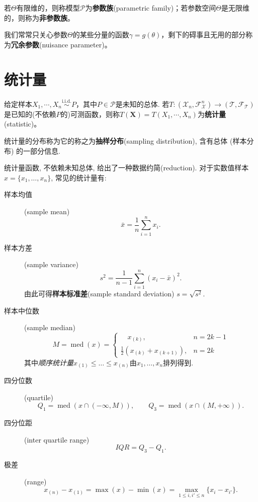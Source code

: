 \begin{definition}
      若$\Theta$有限维的，则称模型$\mathcal{P}$为\textbf{参数族}(parametric family)；若参数空间$\Theta$是无限维的，则称为\textbf{非参数族}。
\end{definition}

我们常常只关心参数$\Theta$的某些分量的函数$\gamma=g(\theta)$，剩下的碍事且无用的部分称为\textbf{冗余参数}(nuisance parameter)。

\section{统计量}

\begin{definition}[统计量]
      给定样本$X_1,\cdots ,X_n \overset{\text{i.i.d.}}{\sim} P$，其中$P \in \mathcal{P}$是未知的总体. 若$ T:(\mathcal{X}_n,\mathscr{F}^n_\mathcal{X})\to (\mathcal{T} ,\mathscr{F}_\mathcal{T})$是已知的(不依赖$P$的)可测函数，则称$T(\mathbf{X})=T(X_1,\cdots ,X_n)$为\textbf{统计量}(statistic)。
\end{definition}

\begin{definition}
      统计量的分布称为它的称之为\textbf{抽样分布}(sampling distribution), 含有总体 (样本分布) 的一部分信息.
\end{definition}

统计量函数, 不依赖未知总体, 给出了一种数据约简(reduction). 对于实数值样本$x = \{x_{1},\dots,x_{n}\}$, 常见的统计量有: \label{descriptive-statistics}
\begin{description}
      \item [样本均值](sample mean)
            \[ \bar{x} = \frac{1}{n}\sum_{i=1}^{n}x_{i}. \]
      \item [样本方差](sample variance)
            \[ s^{2} = \frac{1}{n-1}\sum_{i=1}^{n}(x_{i}-\bar{x})^{2}. \]
            由此可得\textbf{样本标准差}(sample standard deviation) $s = \sqrt{s^2}$.
      \item [样本中位数](sample median)
            \[ M = \operatorname{med}(x) = \begin{cases}
                        \quad x_{(k)},                  & n = 2k-1 \\
                        \frac{1}{2}(x_{(k)}+x_{(k+1)}), & n = 2k
                  \end{cases} \]
            其中\emph{顺序统计量}$x_{(1)}\leq\dots\leq x_{(n)}$由$x_{1},\dots,x_{n}$排列得到.
      \item [四分位数](quartile)
            \[ Q_{1} = \operatorname{med}(x\cap(-\infty,M)), \qquad
                  Q_{3} = \operatorname{med}(x\cap(M,+\infty)). \]
      \item [四分位距](inter quartile range)
            \[ \mathit{IQR} = Q_{3} - Q_{1}. \]
      \item [极差](range)
            \[ x_{(n)}-x_{(1)} = \max(x)-\min(x) = \max_{1\leq i,i' \leq n}\{x_{i}-x_{i'}\}. \]
\end{description}


